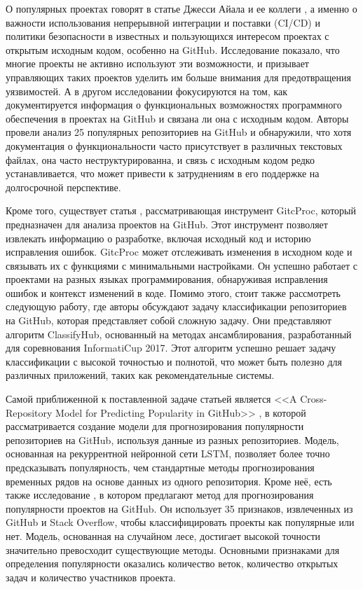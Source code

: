 О популярных проектах говорят в статье Джесси Айала и ее коллеги \cite{AyalaG23}, а именно о важности использования непрерывной интеграции и поставки (CI/CD) и политики безопасности в известных и пользующихся интересом проектах с открытым исходным кодом, особенно на GitHub. Исследование показало, что многие проекты не активно используют эти возможности, и призывает управляющих таких проектов уделить им больше внимания для предотвращения уязвимостей. А в другом исследовании \cite{PuhlfurssMM22} фокусируются на том, как документируется информация о функциональных возможностях программного обеспечения в проектах на GitHub и связана ли она с исходным кодом. Авторы провели анализ 25 популярных репозиториев на GitHub и обнаружили, что хотя документация о функциональности часто присутствует в различных текстовых файлах, она часто неструктурированна, и связь с исходным кодом редко устанавливается, что может привести к затруднениям в его поддержке на долгосрочной перспективе. 

Кроме того, существует статья \cite{CasalnuovoSRR17}, рассматривающая инструмент GitcProc, который предназначен для анализа проектов на GitHub. Этот инструмент позволяет извлекать информацию о разработке, включая исходный код и историю исправления ошибок. GitcProc может отслеживать изменения в исходном коде и связывать их с функциями с минимальными настройками. Он успешно работает с проектами на разных языках программирования, обнаруживая исправления ошибок и контекст изменений в коде. Помимо этого, стоит также рассмотреть следующую работу\cite{SollV17}, где авторы обсуждают задачу классификации репозиториев на GitHub, которая представляет собой сложную задачу. Они представляют алгоритм ClassifyHub, основанный на методах ансамблирования, разработанный для соревнования InformatiCup 2017. Этот алгоритм успешно решает задачу классификации с высокой точностью и полнотой, что может быть полезно для различных приложений, таких как рекомендательные системы.

Самой приближенной к поставленной задаче статьей является <<A Cross-Repository Model for Predicting Popularity in GitHub>> \cite{abs-1902-05216}, в которой рассматривается создание модели для прогнозирования популярности репозиториев на GitHub, используя данные из разных репозиториев. Модель, основанная на рекуррентной нейронной сети LSTM, позволяет более точно предсказывать популярность, чем стандартные методы прогнозирования временных рядов на основе данных из одного репозитория. Кроме неё, есть также исследование \cite{HanDXWY19}, в котором предлагают метод для прогнозирования популярности проектов на GitHub. Он использует 35 признаков, извлеченных из GitHub и Stack Overflow, чтобы классифицировать проекты как популярные или нет. Модель, основанная на случайном лесе, достигает высокой точности значительно превосходит существующие методы. Основными признаками для определения популярности оказались количество веток, количество открытых задач и количество участников проекта.